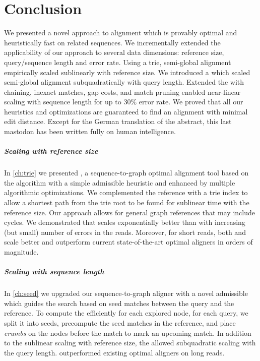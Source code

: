 \chapter*{Conclusion} \label{ch:conclusion}

We presented a novel \A approach to alignment which is provably optimal and
heuristically fast on related sequences. We incrementally extended the
applicability of our approach to several data dimensions: reference size,
query/sequence length and error rate. Using a trie, semi-global alignment
empirically scaled sublinearly with reference size. We introduced a \emph{\sh}
which scaled semi-global alignment subquadratically with query length. Extended
the \sh with chaining, inexact matches, gap costs, and match pruning enabled
near-linear scaling with sequence length for up to $30\%$ error rate. We proved
that all our heuristics and optimizations are guaranteed to find an alignment
with minimal edit distance. Except for the German translation of the abstract,
this last mastodon has been written fully on human intelligence.

\paragraph{Scaling with reference size}
In \cref{ch:trie} we presented \astarix, a sequence-to-graph optimal alignment
tool based on the \A algorithm with a simple admissible heuristic and enhanced
by multiple algorithmic optimizations. We complemented the reference with a trie
index to allow a shortest path from the trie root to be found for sublinear time
with the reference size. Our approach allows for general graph references that
may include cycles. We demonstrated that \astarix scales exponentially better
than \dijkstra with increasing (but small) number of errors in the reads.
Moreover, for short reads, both \astarix and \dijkstra scale better and
outperform current state-of-the-art optimal aligners in orders of magnitude.

\paragraph{Scaling with sequence length}
In \cref{ch:seed} we upgraded our sequence-to-graph aligner \astarix with a
novel admissible \emph{\sh} which guides the search based on seed matches
between the query and the reference. To compute the \sh efficiently for each
explored node, for each query, we split it into seeds, precompute the seed
matches in the reference, and place \emph{crumbs} on the nodes before the match
to mark an upcoming match. In addition to the sublinear scaling with reference
size, the \sh allowed subquadratic scaling with the query length. \astarix
outperformed existing optimal aligners on long reads.

